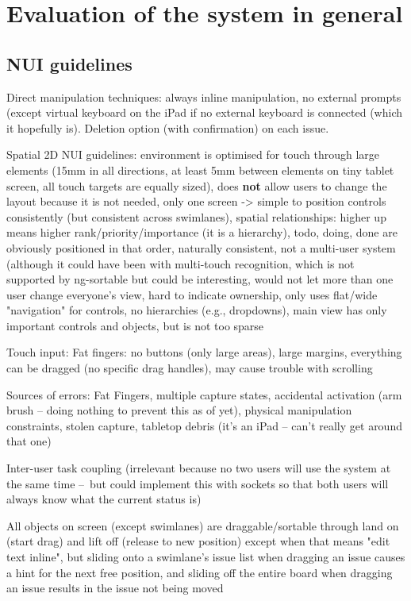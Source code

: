 \section{Evaluation of the system in general}

\subsection{NUI guidelines}

Direct manipulation techniques: always inline manipulation, no external prompts (except virtual keyboard on the iPad if no external keyboard is connected (which it hopefully is). Deletion option (with confirmation) on each issue.

Spatial 2D NUI guidelines: environment is optimised for touch through large elements (15mm in all directions, at least 5mm between elements on tiny tablet screen, all touch targets are equally sized), does \textbf{not} allow users to change the layout because it is not needed, only one screen -> simple to position controls consistently (but consistent across swimlanes), spatial relationships: higher up means higher rank/priority/importance (it is a hierarchy), todo, doing, done are obviously positioned in that order, naturally consistent, not a multi-user system (although it could have been with multi-touch recognition, which is not supported by ng-sortable but could be interesting, would not let more than one user change everyone's view, hard to indicate ownership, only uses flat/wide "navigation" for controls, no hierarchies (e.g., dropdowns), main view has only important controls and objects, but is not too sparse



Touch input: Fat fingers: no buttons (only large areas), large margins, everything can be dragged (no specific drag handles), may cause trouble with scrolling

Sources of errors: Fat Fingers, multiple capture states, accidental activation (arm brush – doing nothing to prevent this as of yet), physical manipulation constraints, stolen capture, tabletop debris (it's an iPad – can't really get around that one)

Inter-user task coupling (irrelevant because no two users will use the system at the same time – but could implement this with sockets so that both users will always know what the current status is)


All objects on screen (except swimlanes) are draggable/sortable through land on (start drag) and lift off (release to new position) except when that means "edit text inline", but sliding onto a swimlane's issue list when dragging an issue causes a hint for the next free position, and sliding off the entire board when dragging an issue results in the issue not being moved %

